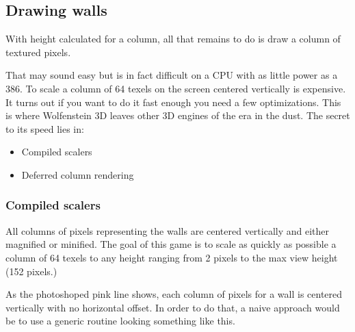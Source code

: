  \begin{minipage}{\textwidth}
 
\centering
\vspace*{0.5cm}
\centering


 \end{minipage}


 \par
 
 \begin{minipage}{\textwidth}
\centering
\vspace*{0.5cm}
\centering
\end{minipage}











\subsection{Drawing walls}
With height calculated for a column, all that remains to do is draw a column of textured pixels.\\
\par
That may sound easy but is in fact difficult on a CPU with as little power as a 386. To scale a column of 64 texels on the screen centered vertically is expensive. It turns out if you want to do it fast enough you need a few optimizations. This is where Wolfenstein 3D leaves other 3D engines of the era in the dust. The secret to its speed lies in:
\begin{itemize}
\item Compiled scalers
\item Deferred column rendering
\end{itemize}
\par

\subsubsection{Compiled scalers}
All columns of pixels representing the walls are centered vertically and either magnified or minified. The goal of this game is to scale as quickly as possible a column of 64 texels to any height ranging from 2 pixels to the max view height (152 pixels.)\\
\par
 \begin{figure}[H]
\centering
 \end{figure}
\par
As the photoshoped pink line shows, each column of pixels for a wall is centered vertically with no horizontal offset. In order to do that, a naive approach would be to use a generic routine looking something like this.\\


